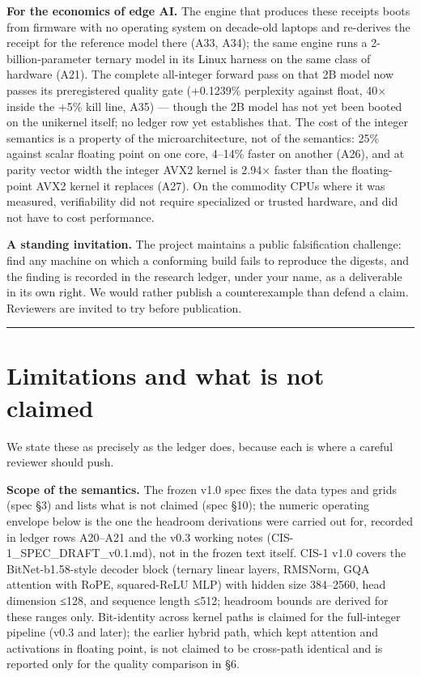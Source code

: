 \documentclass[11pt]{article}
\begin{document}
\textbf{For the economics of edge AI.} The engine that produces these receipts boots from firmware with
no operating system on decade-old laptops and re-derives the receipt for the reference model there
(A33, A34); the same engine runs a 2-billion-parameter ternary model in its Linux harness on the same
class of hardware (A21). The complete all-integer forward pass on that 2B model now passes its
preregistered quality gate (+0.1239\% perplexity against float, 40× inside the +5\% kill line, A35) ---
though the 2B model has not yet been booted on the unikernel itself; no ledger row yet establishes
that. The cost of the integer semantics is a property of the
microarchitecture, not of the semantics: 25\% against scalar floating point on one core, 4--14\% faster
on another (A26), and at parity vector width the integer AVX2 kernel is 2.94× faster than the
floating-point AVX2 kernel it replaces (A27). On the commodity CPUs where it was measured,
verifiability did not require specialized or trusted hardware, and did not have to cost performance.

\textbf{A standing invitation.} The project maintains a public falsification challenge: find any
machine on which a conforming build fails to reproduce the digests, and the finding is recorded in
the research ledger, under your name, as a deliverable in its own right. We would rather publish a
counterexample than defend a claim. Reviewers are invited to try before publication.

\begin{center}\rule{0.5\linewidth}{0.5pt}\end{center}

\section{Limitations and what is not claimed}\label{limitations-and-what-is-not-claimed}

We state these as precisely as the ledger does, because each is where a careful reviewer should push.

\textbf{Scope of the semantics.} The frozen v1.0 spec fixes the data types and grids (spec §3) and lists what is not claimed (spec §10); the numeric operating envelope below is the one the headroom derivations were carried out for, recorded in ledger rows A20--A21 and the v0.3 working notes (CIS-1\_SPEC\_DRAFT\_v0.1.md), not in the frozen text itself. CIS-1 v1.0 covers the BitNet-b1.58-style decoder block
(ternary linear layers, RMSNorm, GQA attention with RoPE, squared-ReLU MLP) with hidden size
384--2560, head dimension ≤128, and sequence length ≤512; headroom bounds are derived for these
ranges only. Bit-identity across kernel paths is claimed for the full-integer pipeline (v0.3 and
later); the earlier hybrid path, which kept attention and activations in floating point, is not
claimed to be cross-path identical and is reported only for the quality comparison in §6.
\end{document}
